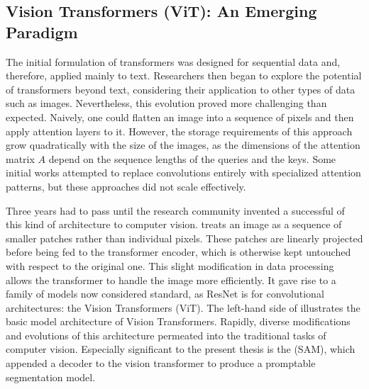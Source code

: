 \subsection{Vision Transformers (ViT): An Emerging Paradigm}
The initial formulation of transformers was designed for sequential data and, therefore, applied mainly to text. Researchers then began to explore the potential of transformers beyond text, considering their application to other types of data such as images. Nevertheless, this evolution proved more challenging than expected. Naively, one could flatten an image into a sequence of pixels and then apply attention layers to it. However, the storage requirements of this approach grow quadratically with the size of the images, as the dimensions of the attention matrix $A$ depend on the sequence lengths of the queries and the keys. Some initial works attempted to replace convolutions entirely with specialized attention patterns, but these approaches did not scale effectively.


Three years had to pass until the research community invented a successful  of this kind of architecture to computer vision.  treats an image as a sequence of smaller patches rather than individual pixels. These patches are linearly projected before being fed to the transformer encoder, which is otherwise kept untouched with respect to the original one. This slight modification in data processing allows the transformer to handle the image more efficiently. It gave rise to a family of models now considered standard, as ResNet is for convolutional architectures: the Vision Transformers (ViT). The left-hand side of  illustrates the basic model architecture of Vision Transformers. Rapidly, diverse modifications and evolutions of this architecture permeated into the traditional tasks of computer vision. Especially significant to the present thesis is the  (SAM), which appended a decoder to the vision transformer to produce a promptable segmentation model. 


